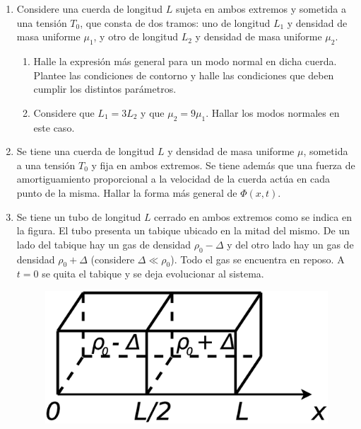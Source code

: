 \documentclass[11pt,spanish]{article}
\begin{document}
\begin{enumerate}

    \item Considere una cuerda de longitud $L$ sujeta en ambos extremos y
    sometida a una tensión $T_{0}$, que consta de dos tramos: uno de longitud
    $L_{1}$ y densidad de masa uniforme $\mu_{1}$, y otro de longitud
    $L_{2}$ y densidad de masa uniforme $\mu_{2}$.

    \begin{enumerate}
        \item Halle la expresión más general para un modo normal en dicha
        cuerda. Plantee las condiciones de contorno y halle las condiciones que
        deben cumplir los distintos parámetros.

        \item Considere que $L_{1}=3L_{2}$ y que $\mu_{2}=9\mu_{1}$. Hallar los
        modos normales en este caso.
    \end{enumerate}


    \item Se tiene una cuerda de longitud $L$ y densidad de masa uniforme $\mu$,
    sometida a una tensión $T_{0}$ y fija en ambos extremos. Se tiene además
    que una fuerza de amortiguamiento proporcional a la velocidad de la cuerda
    actúa en cada punto de la misma. Hallar la forma más general de $\Phi(x,t)$.


    \item Se tiene un tubo de longitud $L$ cerrado en ambos extremos como se
    indica en la figura. El tubo presenta un tabique ubicado en la mitad del
    mismo. De un lado del tabique hay un gas de densidad $\rho_{0}-\Delta$ y del
    otro lado hay un gas de densidad $\rho_{0}+\Delta$ (considere
    $\Delta\ll\rho_{0}$). Todo el gas se encuentra en reposo. A $t=0$ se quita
    el tabique y se deja evolucionar al sistema.

    \begin{figure}[H]
        \centering{}\includegraphics[clip,scale=0.25]{figs/ej1-30}
    \end{figure}


\end{enumerate}
\end{document}
